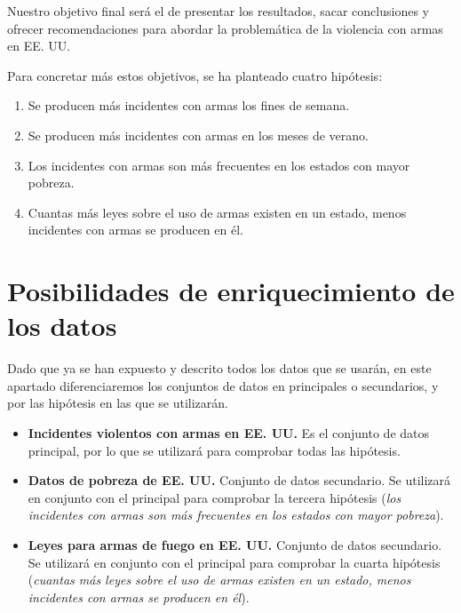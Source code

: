 \documentclass[11pt,a4paper]{article}
\begin{document}
Nuestro objetivo final será el de presentar los resultados, sacar conclusiones y ofrecer recomendaciones para abordar la problemática de la violencia con armas en EE. UU.

Para concretar más estos objetivos, se ha planteado cuatro hipótesis:

\begin{enumerate}
    \item Se producen más incidentes con armas los fines de semana.
    \item Se producen más incidentes con armas en los meses de verano.
    \item Los incidentes con armas son más frecuentes en los estados con mayor pobreza.
    \item Cuantas más leyes sobre el uso de armas existen en un estado, menos incidentes con armas se producen en él. 
\end{enumerate}

\section{Posibilidades de enriquecimiento de los datos}

Dado que ya se han expuesto y descrito todos los datos que se usarán, en este apartado diferenciaremos los conjuntos de datos en principales o secundarios, y por las hipótesis en las que se utilizarán.

\begin{itemize}
    \item \textbf{Incidentes violentos con armas en EE. UU.} Es el conjunto de datos principal, por lo que se utilizará para comprobar todas las hipótesis.
    \item \textbf{Datos de pobreza de EE. UU.} Conjunto de datos secundario. Se utilizará en conjunto con el principal para comprobar la tercera hipótesis (\textit{los incidentes con armas son más frecuentes en los estados con mayor pobreza}).
    \item \textbf{Leyes para armas de fuego en EE. UU.} Conjunto de datos secundario. Se utilizará en conjunto con el principal para comprobar la cuarta hipótesis (\textit{cuantas más leyes sobre el uso de armas existen en un estado, menos incidentes con armas se producen en él}).
\end{itemize}
\end{document}
